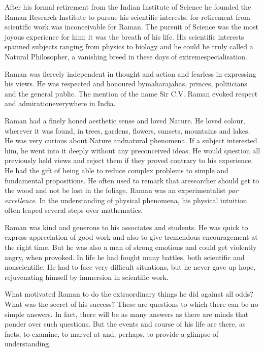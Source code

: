 After his formal retirement from the Indian Institute of Science he founded the Raman Research Institute to pursue his
scientific interests, for retirement from scientific work was inconceivable for \hbox{Raman}. The pursuit of Science was the most joyous experience for him; it was the breath of his life. His scientific interests spanned subjects ranging from physics to biology and he could be truly called a Natural Philosopher, a vanishing breed in these days of extreme\break specialisation.

Raman was fiercely independent in thought and action and fearless in expressing his views. He was respected and honoured by\break maharajahas, princes, politicians and the general public. The mention of the name Sir C.V\@. Raman evoked respect and admiration\break everywhere in India.

Raman had a finely honed aesthetic sense and loved Nature. He loved colour, wherever it was found, in trees, gardens, flowers, sunsets, mountains and lakes. He was very curious about Nature and\break natural phenomena. If a subject interested him, he went into it deeply without any preconceived ideas. He would question all previously held views and reject them if they proved contrary to his experience. He had the gift of being able to reduce complex problems to simple and fundamental propositions. He often used to remark that a\break researcher should get to the wood and not be lost in the foliage. \hbox{Raman} was an experimentalist {\em par excellence}. In the understanding of physical phenomena, his physical intuition often leaped several steps over mathematics.

Raman was kind and generous to his associates and students. He was quick to express appreciation of good work and also to give tremendous encouragement at the right time. But he was also a man of strong emotions and could get violently angry, when provoked. In life he had fought many battles, both scientific and nonscientific. He had to face very difficult situations, but he never gave up hope, rejuvenating himself by immersion in scientific work.

What motivated Raman to do the extraordinary things he did against all odds? What was the secret of his success? These are questions to which there can be no simple answers. In fact, there will be as many answers as there are minds that ponder over such questions. But the events and course of his life are there, as facts, to examine, to marvel at and, perhaps, to provide a glimpse of understanding.

